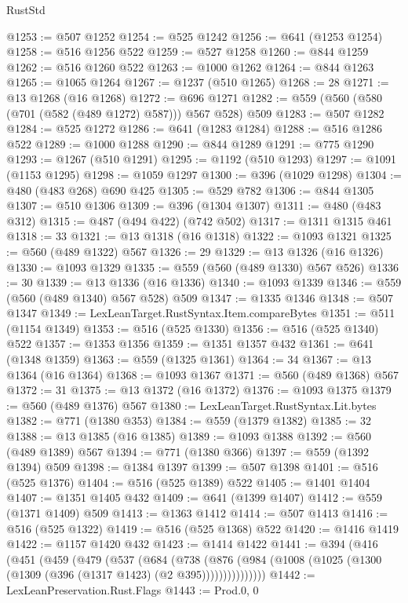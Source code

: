 \begin{lexlean}{RustStd}
\begin{coremodule}
@1253 := @507 @1252
@1254 := @525 @1242
@1256 := @641 (@1253 @1254)
@1258 := @516 @1256 @522
@1259 := @527 @1258
@1260 := @844 @1259
@1262 := @516 @1260 @522
@1263 := @1000 @1262
@1264 := @844 @1263
@1265 := @1065 @1264
@1267 := @1237 (@510 @1265)
@1268 := 28
@1271 := @13 @1268 (@16 @1268)
@1272 := @696 @1271
@1282 := @559 (@560 (@580 (@701 (@582 (@489 @1272) @587))) @567 @528) @509
@1283 := @507 @1282
@1284 := @525 @1272
@1286 := @641 (@1283 @1284)
@1288 := @516 @1286 @522
@1289 := @1000 @1288
@1290 := @844 @1289
@1291 := @775 @1290
@1293 := @1267 (@510 @1291)
@1295 := @1192 (@510 @1293)
@1297 := @1091 (@1153 @1295)
@1298 := @1059 @1297
@1300 := @396 (@1029 @1298)
@1304 := @480 (@483 @268) @690 @425
@1305 := @529 @782
@1306 := @844 @1305
@1307 := @510 @1306
@1309 := @396 (@1304 @1307)
@1311 := @480 (@483 @312)
@1315 := @487 (@494 @422) (@742 @502)
@1317 := @1311 @1315 @461
@1318 := 33
@1321 := @13 @1318 (@16 @1318)
@1322 := @1093 @1321
@1325 := @560 (@489 @1322) @567
@1326 := 29
@1329 := @13 @1326 (@16 @1326)
@1330 := @1093 @1329
@1335 := @559 (@560 (@489 @1330) @567 @526)
@1336 := 30
@1339 := @13 @1336 (@16 @1336)
@1340 := @1093 @1339
@1346 := @559 (@560 (@489 @1340) @567 @528) @509
@1347 := @1335 @1346
@1348 := @507 @1347
@1349 := LexLeanTarget.RustSyntax.Item.compareBytes
@1351 := @511 (@1154 @1349)
@1353 := @516 (@525 @1330)
@1356 := @516 (@525 @1340) @522
@1357 := @1353 @1356
@1359 := @1351 @1357 @432
@1361 := @641 (@1348 @1359)
@1363 := @559 (@1325 @1361)
@1364 := 34
@1367 := @13 @1364 (@16 @1364)
@1368 := @1093 @1367
@1371 := @560 (@489 @1368) @567
@1372 := 31
@1375 := @13 @1372 (@16 @1372)
@1376 := @1093 @1375
@1379 := @560 (@489 @1376) @567
@1380 := LexLeanTarget.RustSyntax.Lit.bytes
@1382 := @771 (@1380 @353)
@1384 := @559 (@1379 @1382)
@1385 := 32
@1388 := @13 @1385 (@16 @1385)
@1389 := @1093 @1388
@1392 := @560 (@489 @1389) @567
@1394 := @771 (@1380 @366)
@1397 := @559 (@1392 @1394) @509
@1398 := @1384 @1397
@1399 := @507 @1398
@1401 := @516 (@525 @1376)
@1404 := @516 (@525 @1389) @522
@1405 := @1401 @1404
@1407 := @1351 @1405 @432
@1409 := @641 (@1399 @1407)
@1412 := @559 (@1371 @1409) @509
@1413 := @1363 @1412
@1414 := @507 @1413
@1416 := @516 (@525 @1322)
@1419 := @516 (@525 @1368) @522
@1420 := @1416 @1419
@1422 := @1157 @1420 @432
@1423 := @1414 @1422
@1441 := @394
    (@416
      (@451
        (@459
          (@479
            (@537
              (@684
                (@738
                  (@876
                    (@984 (@1008 (@1025 (@1300 (@1309 (@396 (@1317 @1423) (@2 @395)))))))))))))))
@1442 := LexLeanPreservation.Rust.Flags
@1443 := Prod.{0, 0}

\end{coremodule}
\end{lexlean}
